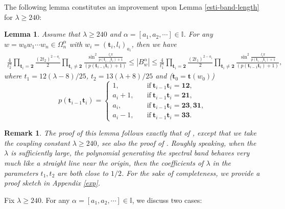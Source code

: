 \documentclass[reqno,11pt,graphicx,]{amsart}
\numberwithin{equation}{section}
\theoremstyle{plain}
\newcommand{\I}{{\mathbb I}}
\newcommand{\3}{\mathbf{3}}
\newtheorem{lemma}[theorem]{Lemma}
\newtheorem{remark}[theorem]{Remark}
\begin{document}
	The following lemma constitutes an improvement upon Lemma \ref{esti-band-length} for $\lambda\geq240$:
	\begin{lemma}\label{estimate-band}
		Assume that $\lambda\geq240$ and $\alpha=[a_1,a_2,\cdots]\in\mathbb{I}$. For any $w=w_0w_1\cdots w_n\in\Omega^{\alpha}_n$ with $w_i=(\mathbf{t}_i,l_i)_{a_i}$, then we have
		\begin{align*}
			\frac{			4}{t_2^n}\prod_{\mathbf{t}_i=\mathbf{2}}\frac{(2t_2)^{2-a_i}}{2}\prod_{\mathbf{t}_i\neq\mathbf{2}}\frac{\sin^2\frac{l_i\pi}{p(\mathbf{t}_{i-1}\mathbf{t}_i)+1}}{(p(\mathbf{t}_{i-1}\mathbf{t}_i)+1)}\leq|B^{\alpha}_w|\leq\frac{4}{t_1^n}\prod_{\mathbf{t}_i=\mathbf{2}}\frac{(2t_1)^{2-a_i}}{2}\prod_{\mathbf{t}_i\neq\mathbf{2}}\frac{\sin^2\frac{l_i\pi}{p(\mathbf{t}_{i-1}\mathbf{t}_i)+1}}{(p(\mathbf{t}_{i-1}\mathbf{t}_i)+1)},
		\end{align*}
		where $t_1=12(\lambda-8)/25$, $t_2=13(\lambda+8)/25$ and ($\mathbf{t}_0=\mathbf{t}(w_0)$)
		\begin{equation}
			p(\mathbf{t}_{i-1}\mathbf{t}_i)=\begin{cases}
				1,\quad&\text{if}\ \mathbf{t}_{i-1}\mathbf{t}_i=\mathbf{1}\mathbf{2},\\
				a_{i}+1,\quad&\text{if}\ \mathbf{t}_{i-1}\mathbf{t}_i=\mathbf{2}\mathbf{1},\\
				a_{i},\quad&\text{if}\ \mathbf{t}_{i-1}\mathbf{t}_i=\mathbf{2}\mathbf{3},\mathbf{3}\mathbf{1},\\
				a_{i}-1,\quad&\text{if}\ \mathbf{t}_{i-1}\mathbf{t}_i=\mathbf{3}\mathbf{3}.
			\end{cases} \label{def-p}
		\end{equation}
	\end{lemma}
	\begin{remark}
		The proof of this lemma follows exactly that of \cite[Propositions 3.2 and 3.3]{FLW2011}, except that we take the coupling constant $\lambda\geq240$, see also the proof of \cite[Lemma 3.7]{LQW2014}. Roughly speaking, when the $\lambda$ is sufficiently large, the polynomial generating the spectral band behaves very much like a straight line near the origin, then the coefficients of $\lambda$ in the parameters $t_1,t_2$ are both close to $1/2$. For the sake of completeness, we provide a proof sketch in Appendix \ref{exp}.
	\end{remark}
	
	Fix $\lambda\geq240$. For any $\alpha=[a_1,a_2,\cdots]\in\I$, we discuss two cases:
	
\end{document}

